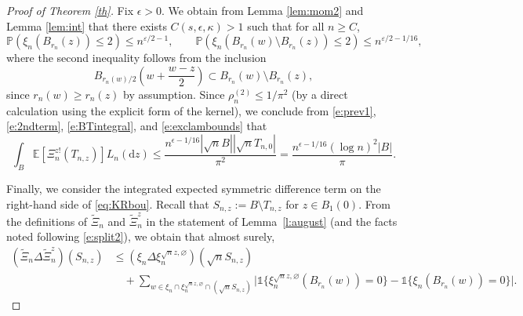 \documentclass{amsart}
\theoremstyle{plain}
\theoremstyle{definition}
\theoremstyle{remark}
\def\E{\mathbb E}
\def\P{\mathbb P}
\def\one{\mathds1}
\def\d{\mathrm d}
\begin{document}
\begin{proof}[Proof of Theorem \ref{th}]
Fix $\epsilon>0$. We obtain from Lemma \ref{lem:mom2} and Lemma \ref{lem:int} that there exists $C(s, \epsilon, \kappa) > 1$ such that for all $n \ge C$, 
\[\P(\xi_n(B_{r_n}(z))\le 2) \le  n^{\varepsilon/2-1}, \qquad \P(\xi_n(B_{r_n}(w) \setminus B_{r_n}(z))\le 2)\le n^{\varepsilon/2-1/16},\] where the second inequality follows from the inclusion \[B_{r_n(w)/2}\left( w+\frac {w-z}{2}\right) \subset B_{r_n}(w) \setminus B_{r_n}(z),\] since $r_n(w) \ge r_n(z)$ by assumption. Since $\rho_n^{(2)} \le 1/\pi^2$ (by a direct calculation using the explicit form of the kernel),  
we conclude from \eqref{e:prev1}, \eqref{e:2ndterm},  \eqref{e:BTintegral}, and \eqref{e:exclambounds} that
$$
	\int_{B}  \E[\Xi_n^{z!}(T_{n,z})] L_n(\d z) \le \frac{n^{\epsilon-1/16}|\sqrt{n} B||\sqrt nT_{n,0}|}{\pi^2}=\frac{n^{\epsilon-1/16}(\log n)^2|B|}{\pi}.
$$

Finally, we consider the integrated expected symmetric difference term on the right-hand side of \eqref{eq:KRbou}.  
Recall that $S_{n,z}:=B \setminus T_{n,z}$ for $z \in B_1(0)$. From the definitions of $\tilde\Xi_n$ and $\tilde\Xi_n^z$ in the statement of Lemma~\ref{l:august} (and the facts noted following \eqref{e:split2}), we obtain that almost surely,
\begin{align}
(\tilde\Xi_n \Delta \tilde\Xi_n^z) (S_{n,z})&\le (\xi_n \Delta  \xi_n^{\sqrt nz,\varnothing}) (\sqrt n S_{n,z})\label{eq:symm1}\\ &\quad+  \sum_{w \in \xi_n \cap  \xi_n^{\sqrt n z,\varnothing}\cap (\sqrt nS_{n,z})} \big|\one \{ \xi_n^{\sqrt nz,\varnothing}(B_{r_n}(w))=0\}-\one \{\xi_n(B_{r_n}(w))=0\} \big|.\label{eq:symm2}
\end{align}


\end{proof}
\end{document}
